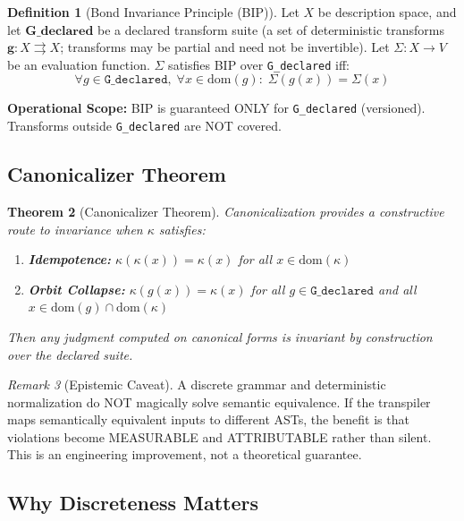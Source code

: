 \documentclass[11pt,letterpaper]{article}
\newtheorem{theorem}{Theorem}[section]
\theoremstyle{definition}
\newtheorem{definition}[theorem]{Definition}
\theoremstyle{remark}
\newtheorem{remark}[theorem]{Remark}
\begin{document}
\begin{definition}[Bond Invariance Principle (BIP)]
\label{def:bip}
Let $X$ be description space, and let $\mathbf{G\_declared}$ be a declared transform suite (a set of deterministic transforms $\mathbf{g}: X \rightrightarrows X$; transforms may be partial and need not be invertible). Let $\Sigma: X \to V$ be an evaluation function. $\Sigma$ satisfies BIP over \texttt{G\_declared} iff:
\[
\forall g \in \texttt{G\_declared},\; \forall x \in \mathrm{dom}(g):\; \Sigma(g(x)) = \Sigma(x)
\]
\end{definition}

\textbf{Operational Scope:} BIP is guaranteed ONLY for \texttt{G\_declared} (versioned). Transforms outside \texttt{G\_declared} are NOT covered.

\subsection{Canonicalizer Theorem}

\begin{theorem}[Canonicalizer Theorem]
\label{thm:canonicalizer}
Canonicalization provides a constructive route to invariance when $\kappa$ satisfies:
\begin{enumerate}
\item \textbf{Idempotence:} $\kappa(\kappa(x)) = \kappa(x)$ for all $x \in \mathrm{dom}(\kappa)$
\item \textbf{Orbit Collapse:} $\kappa(g(x)) = \kappa(x)$ for all $g \in \texttt{G\_declared}$ and all $x \in \mathrm{dom}(g) \cap \mathrm{dom}(\kappa)$
\end{enumerate}
Then any judgment computed on canonical forms is invariant by construction over the declared suite.
\end{theorem}

\begin{remark}[Epistemic Caveat]
A discrete grammar and deterministic normalization do NOT magically solve semantic equivalence. If the transpiler maps semantically equivalent inputs to different ASTs, the benefit is that violations become MEASURABLE and ATTRIBUTABLE rather than silent. This is an engineering improvement, not a theoretical guarantee.
\end{remark}

\subsection{Why Discreteness Matters}
\end{document}

